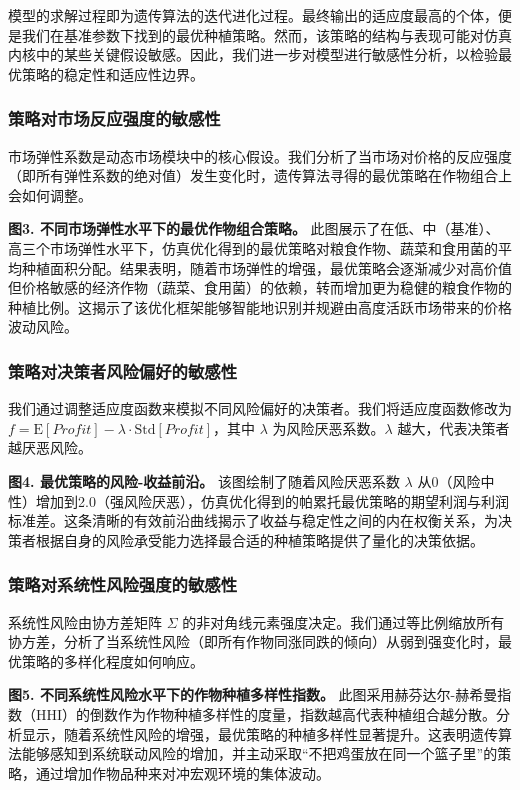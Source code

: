 \documentclass[withoutpreface,bwprint]{cumcmthesis} %
\begin{document}
模型的求解过程即为遗传算法的迭代进化过程。最终输出的适应度最高的个体，便是我们在基准参数下找到的最优种植策略。然而，该策略的结构与表现可能对仿真内核中的某些关键假设敏感。因此，我们进一步对模型进行敏感性分析，以检验最优策略的稳定性和适应性边界。

\subsubsection{策略对市场反应强度的敏感性}

市场弹性系数是动态市场模块中的核心假设。我们分析了当市场对价格的反应强度（即所有弹性系数的绝对值）发生变化时，遗传算法寻得的最优策略在作物组合上会如何调整。

\textbf{图3. 不同市场弹性水平下的最优作物组合策略。} 此图展示了在低、中（基准）、高三个市场弹性水平下，仿真优化得到的最优策略对粮食作物、蔬菜和食用菌的平均种植面积分配。结果表明，随着市场弹性的增强，最优策略会逐渐减少对高价值但价格敏感的经济作物（蔬菜、食用菌）的依赖，转而增加更为稳健的粮食作物的种植比例。这揭示了该优化框架能够智能地识别并规避由高度活跃市场带来的价格波动风险。

\subsubsection{策略对决策者风险偏好的敏感性}

我们通过调整适应度函数来模拟不同风险偏好的决策者。我们将适应度函数修改为 $f = \text{E}[Profit] - \lambda \cdot \text{Std}[Profit]$，其中 $\lambda$ 为风险厌恶系数。$\lambda$ 越大，代表决策者越厌恶风险。

\textbf{图4. 最优策略的风险-收益前沿。} 该图绘制了随着风险厌恶系数 $\lambda$ 从0（风险中性）增加到2.0（强风险厌恶），仿真优化得到的帕累托最优策略的期望利润与利润标准差。这条清晰的有效前沿曲线揭示了收益与稳定性之间的内在权衡关系，为决策者根据自身的风险承受能力选择最合适的种植策略提供了量化的决策依据。

\subsubsection{策略对系统性风险强度的敏感性}

系统性风险由协方差矩阵 $\Sigma$ 的非对角线元素强度决定。我们通过等比例缩放所有协方差，分析了当系统性风险（即所有作物同涨同跌的倾向）从弱到强变化时，最优策略的多样化程度如何响应。

\textbf{图5. 不同系统性风险水平下的作物种植多样性指数。} 此图采用赫芬达尔-赫希曼指数（HHI）的倒数作为作物种植多样性的度量，指数越高代表种植组合越分散。分析显示，随着系统性风险的增强，最优策略的种植多样性显著提升。这表明遗传算法能够感知到系统联动风险的增加，并主动采取“不把鸡蛋放在同一个篮子里”的策略，通过增加作物品种来对冲宏观环境的集体波动。
\end{document}

